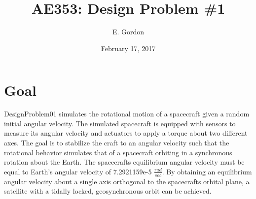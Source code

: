 \documentclass[12pt]{article}
\title{AE353: Design Problem \#1}
\author{E. Gordon}
\date{February 17, 2017}
\begin{document}
\maketitle
\long{}

\section{Goal}

DesignProblem01 simulates the rotational motion of a spacecraft given a random initial angular velocity. The simulated spacecraft is equipped with sensors to measure its angular velocity and actuators to apply a torque about two different axes. The goal is to stabilize the craft to an angular velocity such that the rotational behavior simulates that of a spacecraft orbiting in a synchronous rotation about the Earth. The spacecrafts equilibrium angular velocity must be equal to Earth's angular velocity of 7.2921159e-5 \( \frac{rad}{sec} \). By obtaining an equilibrium angular velocity about a single axis orthogonal to the spacecrafts orbital plane, a satellite with a tidally locked, geosynchronous orbit can be achieved.
\end{document}
